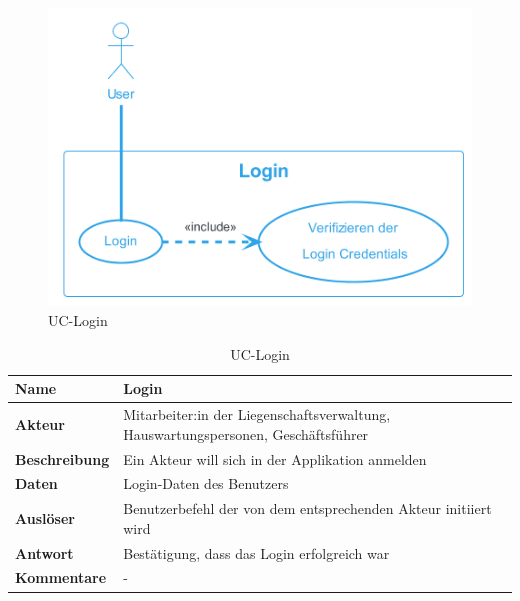 
\begin{figure}[H]
  \begin{center}
    \includegraphics[width=0.6\linewidth]{content/diagrams/out/usecase/login/Login.png}
    \caption{UC-Login}
    \label{login}
  \end{center}
\end{figure}

\begin{table}[H]
  \centering
  \settowidth{}
  \setlength\extrarowheight{2pt}
  \begin{tabulary}{1.0\textwidth}{|a|m{14cm}|}
    \hline
    \textbf{Name}& Login\\
    \hline
    \textbf{Akteur}& Mitarbeiter:in der Liegenschaftsverwaltung, Hauswartungspersonen, Geschäftsführer\\
    \hline 
    \textbf{Beschreibung} & Ein Akteur will sich in der Applikation anmelden\\
    \hline
    \textbf{Daten} & Login-Daten des Benutzers\\
    \hline
    \textbf{Auslöser} & Benutzerbefehl der von dem entsprechenden Akteur initiiert wird\\
    \hline
    \textbf{Antwort} & Bestätigung, dass das Login erfolgreich war\\
    \hline
    \textbf{Kommentare} & -\\
    \hline
  \end{tabulary}
  \caption{UC-Login}
\end{table}

